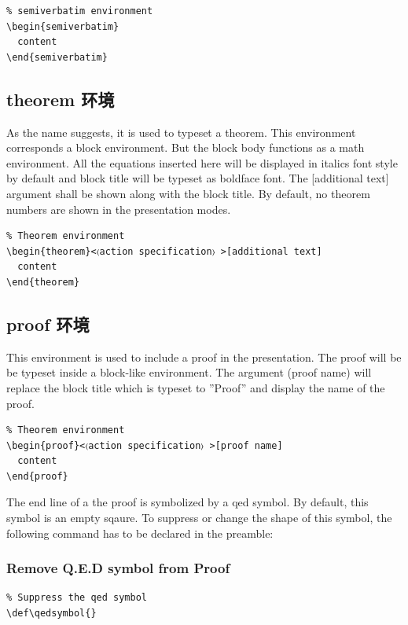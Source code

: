 \begin{verbatim}
% semiverbatim environment
\begin{semiverbatim}
  content
\end{semiverbatim}
\end{verbatim}

\subsection{{\ttfamily theorem} 环境}

As the name suggests, it is used to typeset a theorem. This environment corresponds a block environment. But the block body functions as a math environment. All the equations inserted here will be displayed in italics font style by default and block title will be typeset as boldface font. The [additional text] argument shall be shown along with the block title. By default, no theorem numbers are shown in the presentation modes.

\begin{verbatim}
% Theorem environment
\begin{theorem}<〈action specification〉 >[additional text]
  content
\end{theorem}
\end{verbatim}

\subsection{{\ttfamily proof} 环境}

This environment is used to include a proof in the presentation. The proof will be be typeset inside a block-like environment. The argument (proof name) will replace the block title which is typeset to ”Proof” and display the name of the proof.

\begin{verbatim}
% Theorem environment
\begin{proof}<〈action specification〉 >[proof name]
  content
\end{proof}
\end{verbatim}

The end line of a the proof is symbolized by a qed symbol. By default, this symbol is an empty sqaure. To suppress or change the shape of this symbol, the following command has to be declared in the preamble:

\subsubsection{Remove Q.E.D symbol from Proof}
\begin{verbatim}
% Suppress the qed symbol
\def\qedsymbol{} 
\end{verbatim}

